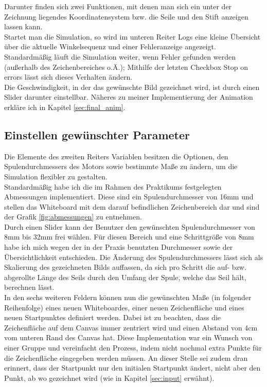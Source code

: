 Darunter finden sich zwei Funktionen, mit denen man sich ein unter der Zeichnung liegendes Koordinatensystem bzw. die Seile und den Stift anzeigen lassen kann. \\
Startet man die Simulation, so wird im unteren Reiter \glqq{}Logs\grqq{} eine kleine  Übersicht über  die aktuelle Winkelsequenz und einer Fehleranzeige angezeigt. Standardmäßig läuft die Simulation weiter, wenn Fehler gefunden werden (außerhalb des Zeichenbereiches o.Ä.); Mithilfe der letzten Checkbox \glqq{}Stop on errors\grqq{} lässt sich dieses Verhalten ändern. \\
Die Geschwindigkeit, in der das gewünschte Bild gezeichnet wird, ist durch einen Slider darunter einstellbar. Näheres zu meiner Implementierung der Animation erkläre ich in Kapitel \ref{sec:final_anim}.

\subsection{Einstellen gewünschter Parameter}
\label{sec:paras}
Die Elemente des zweiten Reiters \glqq{}Variablen\grqq{} besitzen die Optionen, den Spulendurchmessers des Motors sowie bestimmte Maße zu ändern, um die Simulation flexibler zu gestalten. \\
Standardmäßig habe ich die im Rahmen des Praktikums festgelegten Abmessungen implementiert. Diese sind ein Spulendurchmesser von 16mm und stellen das Whiteboard mit dem darauf befindlichen Zeichenbereich dar und sind der Grafik \ref{fig:abmessungen} zu entnehmen. \\
Durch einen Slider kann der Benutzer den gewünschten Spulendurchmesser von 8mm bis 32mm frei wählen. Für diesen Bereich und eine Schrittgröße von 8mm habe ich mich wegen der in der Praxis benutzten Durchmesser sowie der Übersichtlichkeit entschieden. Die Änderung des Spulendurchmessers lässt sich als Skalierung des gezeichneten Bilds auffassen, da sich pro Schritt die auf- bzw. abgerollte Länge des Seils durch den Umfang der Spule, welche das Seil hält, berechnen lässt. \\
In den sechs weiteren Feldern können nun die gewünschten Maße (in folgender Reihenfolge) eines neuen Whiteboardes, einer neuen Zeichenfläche  und eines neuen Startpunktes definiert werden. Dabei ist zu beachten, dass die Zeichenfläche auf dem Canvas immer zentriert wird und einen Abstand von 4cm vom unteren Rand des Canvas hat. Diese Implementation war ein Wunsch von einer Gruppe und vereinfacht den Prozess, indem nicht nochmal extra Punkte für die Zeichenfläche  eingegeben werden müssen. An dieser Stelle sei zudem dran erinnert, dass der Startpunkt nur den initialen Startpunkt ändert, nicht aber den Punkt, ab wo gezeichnet wird (wie in Kapitel \ref{sec:input} erwähnt).

